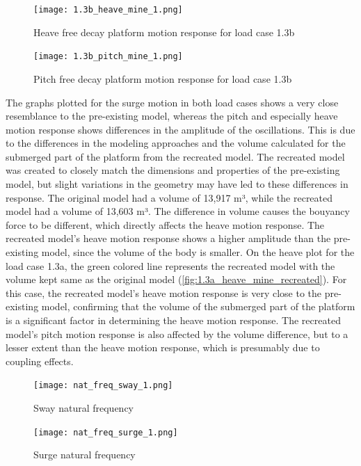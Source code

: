 \documentclass[a4paper, 11pt]{article}
\begin{document}
\begin{figure}[H]
    \begin{minipage}{0.47\textwidth}
        \centering
        \texttt{[image: 1.3b\_heave\_mine\_1.png]}
        \caption{\small Heave free decay platform motion response for load case 1.3b}
        \label{fig:1.3b_heave_mine_recreated}
    \end{minipage}
    \hfill
    \begin{minipage}{0.49\textwidth}
        \centering
        \texttt{[image: 1.3b\_pitch\_mine\_1.png]}
        \caption{\small Pitch free decay platform motion response for load case 1.3b}
        \label{fig:1.3b_pitch_mine_recreated}
    \end{minipage}
\end{figure}

The graphs plotted for the surge motion in both load cases shows a very close resemblance to the pre-existing model, whereas the pitch and especially heave motion response shows differences in the amplitude of the oscillations. This is due to the differences in the modeling approaches and the volume calculated for the submerged part of the platform from the recreated model. The recreated model was created to closely match the dimensions and properties of the pre-existing model, but slight variations in the geometry may have led to these differences in response. The original model had a volume of 13,917 m³, while the recreated model had a volume of 13,603 m³. The difference in volume causes the bouyancy force to be different, which directly affects the heave motion response. The recreated model's heave motion response shows a higher amplitude than the pre-existing model, since the volume of the body is smaller. On the heave plot for the load case 1.3a, the green colored line represents the recreated model with the volume kept same as the original model (\autoref{fig:1.3a_heave_mine_recreated}). For this case, the recreated model's heave motion response is very close to the pre-existing model, confirming that the volume of the submerged part of the platform is a significant factor in determining the heave motion response. The recreated model's pitch motion response is also affected by the volume difference, but to a lesser extent than the heave motion response, which is presumably due to coupling effects.

\begin{figure}[H]
    \begin{minipage}{0.47\textwidth}
        \centering
        \texttt{[image: nat\_freq\_sway\_1.png]}
        \caption{\small Sway natural frequency}
        \label{fig:nat_freq_sway_recreated}
    \end{minipage}
    \hfill
    \begin{minipage}{0.48\textwidth}
        \centering
        \texttt{[image: nat\_freq\_surge\_1.png]}
        \caption{\small Surge natural frequency}
        \label{fig:nat_freq_surge_recreated}
    \end{minipage}
\end{figure}
\end{document}
